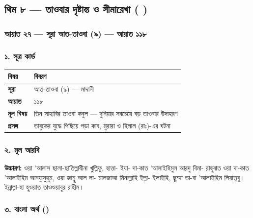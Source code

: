 \subsection*{থিম ৮ — তাওবার দৃষ্টান্ত ও সীমারেখা ( \lat{\&} )}

\subsubsection*{আয়াত ২৭ — সূরা আত-তাওবা (৯) — আয়াত ১১৮}

\subsubsection*{১. সূত্র কার্ড}

\begin{table}[h]\centering\small
\begin{tabular}{ll}
বিষয় & বিবরণ \\
\hline
\textbf{সূরা} & আত-তাওবা (৯) — মাদানী \\
\textbf{আয়াত} & ১১৮ \\
\textbf{মূল বিষয়} & তিন সাহাবির তাওবা কবুল — দুনিয়ার সবচেয়ে বড় তাওবার উদাহরণ \\
\textbf{প্রসঙ্গ} & তাবুকের যুদ্ধে পিছিয়ে পড়া কাব, মুরারা ও হিলাল (রাঃ)-এর ঘটনা \\
\hline
\end{tabular}
\end{table}

\subsubsection*{২. মূল আরবি}

\begin{center}\end{center}
\textbf{উচ্চারণ:} ওয়া 'আলাস ছালা-ছাতিল্লাযীনা খুল্লিফূ, হাত্তা- ইযা- দা-কাত 'আলাইহিমুল আরদু বিমা- রাহুবাত ওয়া দা-কাত 'আলাইহিম আনফুসুহুম, ওয়া জান্নু আল লা- মালজাআ মিনাল্লাহি ইল্লা- ইলাইহি, ছুম্মা তা-বা 'আলাইহিম লিয়াতূবূ। ইন্নাল্লা-হা হুওয়াত তাওওয়াবুর রাহীম।

\subsubsection*{৩. বাংলা অর্থ ()}


